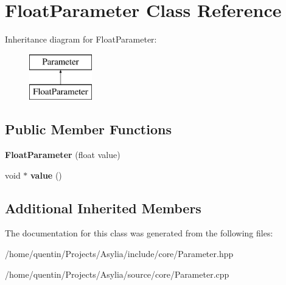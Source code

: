\hypertarget{classFloatParameter}{\section{Float\-Parameter Class Reference}
\label{classFloatParameter}
}
Inheritance diagram for Float\-Parameter\-:\begin{figure}[H]
\begin{center}
\leavevmode
\includegraphics[height=2.000000cm]{classFloatParameter}
\end{center}
\end{figure}
\subsection*{Public Member Functions}
\begin{DoxyCompactItemize}
\item 
\hypertarget{classFloatParameter_aeadaeb2f142c3089523d6a4d8138ceb9}{{\bfseries Float\-Parameter} (float value)}\label{classFloatParameter_aeadaeb2f142c3089523d6a4d8138ceb9}

\item 
\hypertarget{classFloatParameter_a08cacafe82a4539fec410e5a8b2eeede}{void $\ast$ {\bfseries value} ()}\label{classFloatParameter_a08cacafe82a4539fec410e5a8b2eeede}

\end{DoxyCompactItemize}
\subsection*{Additional Inherited Members}


The documentation for this class was generated from the following files\-:\begin{DoxyCompactItemize}
\item 
/home/quentin/\-Projects/\-Asylia/include/core/Parameter.\-hpp\item 
/home/quentin/\-Projects/\-Asylia/source/core/Parameter.\-cpp\end{DoxyCompactItemize}

